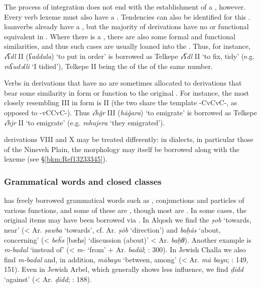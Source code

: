 \documentclass[output=paper]{langsci/langscibook}
\begin{document}
The process of integration does not end with the establishment of a , however. Every verb lexeme must also have a . Tendencies can also be identified for this \citep{Coghill2015}.  loanverbs already have a , but the majority of  derivations have no  or functional equivalent in . Where there is a , there are also some formal and functional similarities, and thus such cases are usually loaned into the  . Thus, for instance,  \textit{√ʕdl} II (\textit{ʕaddala}) ‘to put in order’ is borrowed as  Telkepe \textit{√ʕdl} II ‘to fix, tidy’ (e.g. \textit{mʕudəlli} ‘I tidied’), Telkepe  II being the  of the   of the same number.

Verbs in  derivations that have no  are sometimes allocated to derivations that bear some similarity in form or function to the original . For instance, the   most closely resembling   III in form is  II (the two share the template -CvCvC-, as opposed to -vCCvC-). Thus  \textit{√hğr} III (\textit{hāğara}) ‘to emigrate’ is borrowed as  Telkepe \textit{√hjr} II ‘to emigrate’ (e.g. \textit{mhujera} ‘they emigrated’).

 derivations VIII and X may be treated differently: in   dialects, in particular those of the Nineveh Plain, the  morphology may itself be borrowed along with the lexeme (see §\ref{bkm:Ref13233345}).

\subsubsection{Grammatical words and closed classes}\label{closedclass}

 has freely borrowed grammatical words such as , conjunctions and particles of various functions, and some of these are , though most are . In some cases, the original  items may have been borrowed via . In  Alqosh we find the  \textit{ṣob} ‘towards, near’ (< Ar. \textit{ṣawba} ‘towards’, cf.  Ar. \textit{ṣōb} ‘direction’) and \textit{baḥás} ‘about, concerning’ (<  \textit{be\"{h}s} [bæħs] ‘discussion (about)’ < Ar. \textit{baḥθ}). Another example is \textit{m-badal} ‘instead of’ (< \textit{m-} ‘from’ +  Ar. \textit{badāl}; \citealt{Coghill2004}: 300). In Jewish Challa we also find \textit{m-badal} and, in addition, \textit{mābayn} ‘between, among’ (< Ar. \textit{mā} \textit{bayn}; \citealt{Fassberg2010}: 149, 151). Even in Jewish Arbel, which generally shows less  influence, we find \textit{ḍidd} ‘against’ (< Ar. \textit{ḍidd}; \citealt{Khan1999}: 188).
\end{document}
